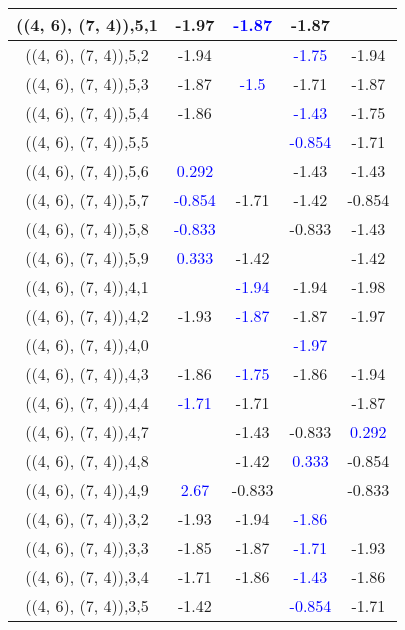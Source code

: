 \documentclass{article}
\begin{document}
\begin{center}
\begin{longtable}{|c|c|c|c|c|}
        	\hline
        	((4, 6), (7, 4)),5,1&-1.97& \textcolor{blue}{-1.87}&-1.87&\\
        	\hline
        	((4, 6), (7, 4)),5,2&-1.94&& \textcolor{blue}{-1.75}&-1.94\\
        	\hline
        	((4, 6), (7, 4)),5,3&-1.87& \textcolor{blue}{-1.5}&-1.71&-1.87\\
        	\hline
        	((4, 6), (7, 4)),5,4&-1.86&& \textcolor{blue}{-1.43}&-1.75\\
        	\hline
        	((4, 6), (7, 4)),5,5&&& \textcolor{blue}{-0.854}&-1.71\\
        	\hline
        	((4, 6), (7, 4)),5,6& \textcolor{blue}{0.292}&&-1.43&-1.43\\
        	\hline
        	((4, 6), (7, 4)),5,7& \textcolor{blue}{-0.854}&-1.71&-1.42&-0.854\\
        	\hline
        	((4, 6), (7, 4)),5,8& \textcolor{blue}{-0.833}&&-0.833&-1.43\\
        	\hline
        	((4, 6), (7, 4)),5,9& \textcolor{blue}{0.333}&-1.42&&-1.42\\
        	\hline
        	((4, 6), (7, 4)),4,1&& \textcolor{blue}{-1.94}&-1.94&-1.98\\
        	\hline
        	((4, 6), (7, 4)),4,2&-1.93& \textcolor{blue}{-1.87}&-1.87&-1.97\\
        	\hline
        	((4, 6), (7, 4)),4,0&&& \textcolor{blue}{-1.97}&\\
        	\hline
        	((4, 6), (7, 4)),4,3&-1.86& \textcolor{blue}{-1.75}&-1.86&-1.94\\
        	\hline
        	((4, 6), (7, 4)),4,4& \textcolor{blue}{-1.71}&-1.71&&-1.87\\
        	\hline
        	((4, 6), (7, 4)),4,7&&-1.43&-0.833& \textcolor{blue}{0.292}\\
        	\hline
        	((4, 6), (7, 4)),4,8&&-1.42& \textcolor{blue}{0.333}&-0.854\\
        	\hline
        	((4, 6), (7, 4)),4,9& \textcolor{blue}{2.67}&-0.833&&-0.833\\
        	\hline
        	((4, 6), (7, 4)),3,2&-1.93&-1.94& \textcolor{blue}{-1.86}&\\
        	\hline
        	((4, 6), (7, 4)),3,3&-1.85&-1.87& \textcolor{blue}{-1.71}&-1.93\\
        	\hline
        	((4, 6), (7, 4)),3,4&-1.71&-1.86& \textcolor{blue}{-1.43}&-1.86\\
        	\hline
        	((4, 6), (7, 4)),3,5&-1.42&& \textcolor{blue}{-0.854}&-1.71\\

\end{longtable}
\end{center}
\end{document}
